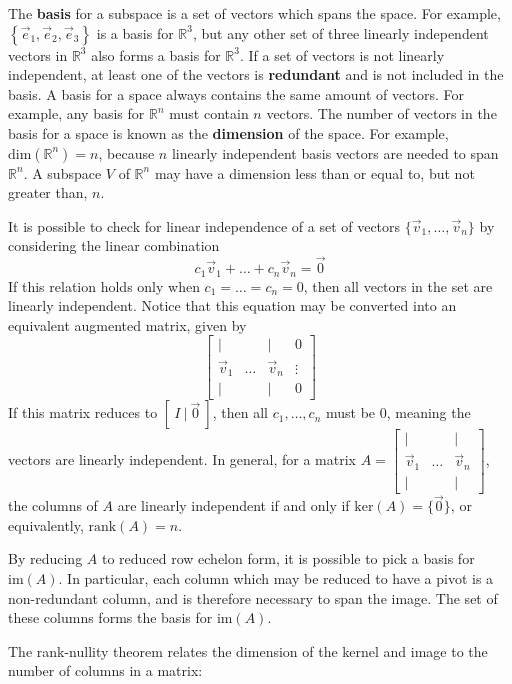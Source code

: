 The \textbf{basis} for a subspace is a set of vectors which spans the space. For example, $\left\{ \vec{e}_1,\vec{e}_2,\vec{e}_3\right\}$ is a basis for $\mathbb{R}^3$, but any other set of three linearly independent vectors in $\mathbb{R}^3$ also forms a basis for $\mathbb{R}^3$. If a set of vectors is not linearly independent, at least one of the vectors is \textbf{redundant} and is not included in the basis. A basis for a space always contains the same amount of vectors. For example, any basis for $\mathbb{R}^n$ must contain $n$ vectors. The number of vectors in the basis for a space is known as the \textbf{dimension} of the space. For example, $\text{dim}(\mathbb{R}^n) = n$, because $n$ linearly independent basis vectors are needed to span $\mathbb{R}^n$. A subspace $V$ of $\mathbb{R}^n$ may have a dimension less than or equal to, but not greater than, $n$.

It is possible to check for linear independence of a set of vectors $\{\vec{v}_1,\dots,\vec{v}_n\}$ by considering the linear combination \[c_1\vec{v}_1 + \dots + c_n\vec{v}_n = \vec{0}\] If this relation holds only when $c_1=\dots=c_n = 0$, then all vectors in the set are linearly independent. Notice that this equation may be converted into an equivalent augmented matrix, given by \[\left[\begin{array}{ccc|c}
| & & | & 0\\
\vec{v}_1 & \dots & \vec{v}_n & \vdots\\
| & & | & 0
\end{array}\right]\]
If this matrix reduces to $[\ I \ |\ \vec{0}\ ]$, then all $c_1,\dots,c_n$ must be $0$, meaning the vectors are linearly independent. In general, for a matrix $A = \begin{bmatrix}
    | & & |\\
    \vec{v}_1 & \dots & \vec{v}_n\\
    | & & |
\end{bmatrix}$, the columns of $A$ are linearly independent if and only if $\text{ker}(A) = \{\vec{0}\}$, or equivalently, $\text{rank}(A) = n$. 

By reducing $A$ to reduced row echelon form, it is possible to pick a basis for $\text{im}(A)$. In particular, each column which may be reduced to have a pivot is a non-redundant column, and is therefore necessary to span the image. The set of these columns forms the basis for $\text{im}(A)$.

The rank-nullity theorem relates the dimension of the kernel and image to the number of columns in a matrix:

